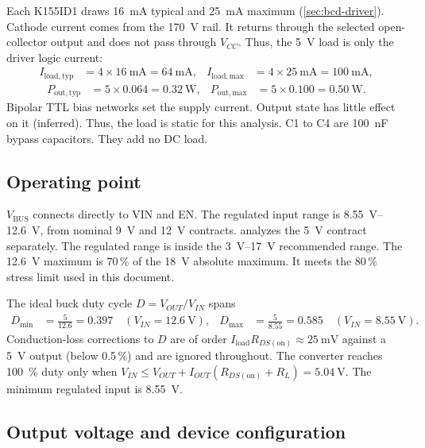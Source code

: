 Each K155ID1 draws \SI{16}{\milli\ampere} typical and
\SI{25}{\milli\ampere} maximum (\cref{sec:bcd-driver}). Cathode current comes
from the 170~V rail. It returns through the selected open-collector output and
does not pass through $V_{CC}$. Thus, the 5~V load is only the driver logic
current:
\begin{align*}
  I_{\mathrm{load,typ}} &= 4 \times \SI{16}{\milli\ampere} = \SI{64}{\milli\ampere}, &
  I_{\mathrm{load,max}} &= 4 \times \SI{25}{\milli\ampere} = \SI{100}{\milli\ampere},
\end{align*}
\begin{align*}
  P_{\mathrm{out,typ}} &= 5 \times 0.064 = \SI{0.32}{\watt}, &
  P_{\mathrm{out,max}} &= 5 \times 0.100 = \SI{0.50}{\watt}.
\end{align*}
Bipolar TTL bias networks set the supply current. Output state has little effect
on it (inferred). Thus, the load is static for this analysis. C1 to C4 are
\SI{100}{\nano\farad} bypass capacitors. They add no DC load.

\subsection{Operating point}\label{sec:5v-input}

$V_{\mathrm{BUS}}$ connects directly to VIN and EN. The regulated input range is
\SIrange{8.55}{12.6}{\volt}, from nominal \SI{9}{\volt} and
\SI{12}{\volt} contracts.  analyzes the
\SI{5}{\volt} contract separately. The regulated range is inside the
\SIrange{3}{17}{\volt} recommended range. The \SI{12.6}{\volt} maximum is
$70\,\%$ of the \SI{18}{\volt} absolute maximum. It meets the $80\,\%$ stress
limit used in this document.

The ideal buck duty cycle $D = V_{OUT}/V_{IN}$ spans
\begin{align*}
  D_{\min} &= \frac{5}{12.6} = 0.397 \quad (V_{IN}=\SI{12.6}{\volt}), &
  D_{\max} &= \frac{5}{8.55} = 0.585 \quad (V_{IN}=\SI{8.55}{\volt}).
\end{align*}
Conduction-loss corrections to $D$ are of order $I_{\mathrm{load}} R_{DS(\mathrm{on})}
\approx \SI{25}{\milli\volt}$ against a 5~V output (below 0.5\,\%) and are ignored
throughout. The converter reaches \SI{100}{\percent} duty only when
$V_{IN}\leq V_{OUT}+I_{OUT}(R_{DS(\mathrm{on})}+R_L)=\SI{5.04}{\volt}$.
The minimum regulated input is \SI{8.55}{\volt}.

\subsection{Output voltage and device configuration}\label{sec:5v-vset}


